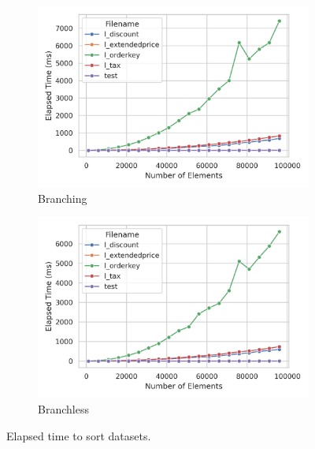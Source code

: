 \documentclass[a4paper,10pt]{article}
\begin{document}
\begin{figure}[htbp]
    \centering
    \begin{subfigure}[b]{0.40\textwidth}
        \centering
        \includegraphics[width=\textwidth]{../graphs/branching_elapsed.png}
        \caption{Branching}
        \label{fig:elapsed_branching}
    \end{subfigure}
    \begin{subfigure}[b]{0.40\textwidth}
        \centering
        \includegraphics[width=\textwidth]{../graphs/condition-assign_elapsed.png}
        \caption{Branchless}
        \label{fig:elapsed_branchless}
    \end{subfigure}
    \caption{Elapsed time to sort datasets.}
    \label{fig:elapsed_time}
\end{figure}
\end{document}
